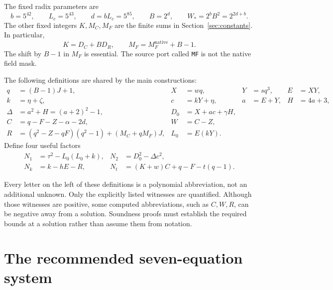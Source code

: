 \documentclass[11pt,a4paper]{article}
\theoremstyle{remark}
\newcommand{\code}[1]{\nolinkurl{#1}}
\newcommand{\mc}{M_C}
\newcommand{\mf}{M_F}
\newcommand{\nf}{N_1}
\newcommand{\nm}{N_2}
\newcommand{\nk}{N_k}
\newcommand{\nt}{N_t}
\begin{document}
The fixed radix parameters are
\begin{equation}
 b=5^{42},\qquad L_c=5^{43},\qquad d=bL_c=5^{85},\qquad
 B=2^d,\qquad W_*=2^bB^2=2^{2d+b}.
\label{eq:radices}
\end{equation}
The other fixed integers $K,\mc,\mf$ are the finite sums in
Section~\ref{sec:constants}. In particular,
\begin{equation}
 K=D_C+BD_R,\qquad \mf=M_F^{\mathrm{native}}+B-1.
\label{eq:ports}
\end{equation}
The shift by $B-1$ in $\mf$ is essential. The source port called
\code{MF} is not the native field mask.

The following definitions are shared by the main constructions:
\begin{align}
 q&=(B-1)J+1,& X&=wq,& Y&=sq^3,& E&=XY,\label{eq:common1}\\
 k&=\eta+\zeta,& c&=kY+\eta,& a&=E+Y,& H&=4a+3,\label{eq:common2}\\
 \Delta&=a^2+H=(a+2)^2-1,&
 D_0&=X+ac+\gamma H,\label{eq:common3}\\
 C&=q-F-Z-\alpha-2d,& W&=C-Z,\label{eq:common4}\\
 R&=(q^2-Z-qF)(q^2-1)+(\mc+q\mf)J,& L_0&=E(kY).
 \label{eq:common5}
\end{align}
Define four useful factors
\begin{align}
 \nf&=\tau^2-L_0(L_0+k),&
 \nm&=D_0^2-\Delta c^2,\label{eq:factors1}\\
 \nk&=k-hE-R,&
 \nt&=(K+w)C+q-F-t(q-1).\label{eq:factors2}
\end{align}

Every letter on the left of these definitions is a polynomial
abbreviation, not an additional unknown. Only the explicitly listed
witnesses are quantified. Although those witnesses are positive, some
computed abbreviations, such as $C,W,R$, can be negative away from a
solution. Soundness proofs must establish the required bounds at a
solution rather than assume them from notation.

\section{The recommended seven-equation system}
\label{sec:system}
\end{document}
